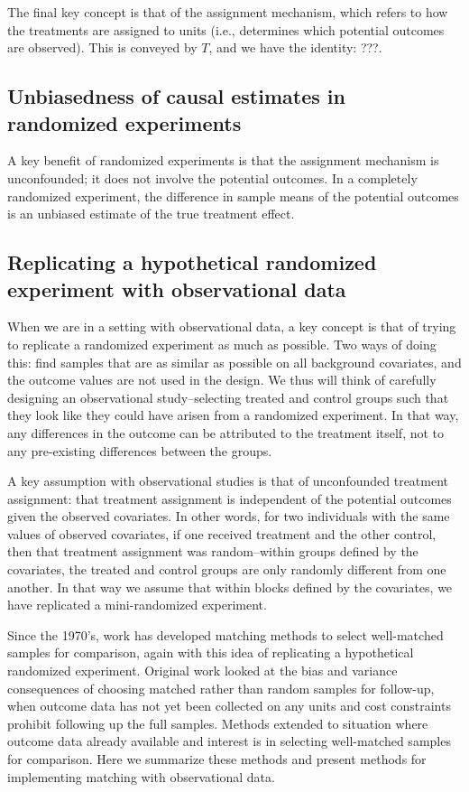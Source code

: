 \documentclass[11pt,titlepage]{article}
\begin{document}
The final key concept is that of the assignment mechanism, which refers to how the treatments are assigned to units (i.e., determines which potential outcomes
are observed).  This is conveyed by $T$, and we have the identity: ???.  

\subsection{Unbiasedness of causal estimates in randomized experiments}
A key benefit of randomized experiments is that the assignment mechanism is unconfounded; it does not involve the potential outcomes.  
In a completely randomized experiment, the difference in sample means of the potential outcomes is an unbiased estimate of the true treatment effect.  


\subsection{Replicating a hypothetical randomized experiment with observational data}
When we are in a setting with observational data, a key concept is that of trying to replicate a randomized experiment as much as possible.  
Two ways of doing this: find samples that are as similar as possible on all background covariates, and the outcome values are not used in the design.  We thus
will think of carefully designing an observational study--selecting treated and control groups such that they look like they could have arisen from a randomized
experiment.  In that way, any differences in the outcome can be attributed to the treatment itself, not to any pre-existing differences between the groups. 

A key assumption with observational studies is that of unconfounded treatment assignment: that treatment assignment is independent of the potential outcomes
given the observed covariates.  In other words, for two individuals with the same values of observed covariates, if one received treatment and the other control,
then that treatment assignment was random--within groups defined by the covariates, the treated and control groups are only randomly different from one another.
In that way we assume that within blocks defined by the covariates, we have replicated a mini-randomized experiment.  

Since the 1970's, work has developed matching methods to select well-matched samples for comparison, again with this idea of replicating a hypothetical
randomized experiment.  Original work looked at the bias and variance consequences  of choosing matched rather than random samples for follow-up, when
outcome data has not yet been collected on any units and cost constraints prohibit following up the full samples.  Methods extended to situation 
where outcome data already available and interest is in selecting well-matched samples for comparison.  Here we summarize these methods and
present methods for implementing matching with observational data.
\end{document}
